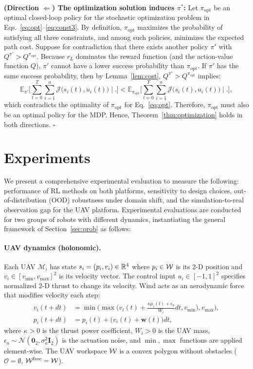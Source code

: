\documentclass{article}
\providecommand{\obst}{\mathcal{O}}
\providecommand{\free}{\mathrm{free}}
\begin{document}
\textbf{(Direction $\Leftarrow$) The optimization solution induces $\pi^*$:} Let $\pi_{\mathrm{opt}}$ be an optimal closed-loop policy for the stochastic optimization problem in Eqs.~\eqref{eq:opt}--\eqref{eq:const3}. By definition, $\pi_{\mathrm{opt}}$ maximizes the probability of satisfying all three constraints, and among such policies, minimizes the expected path cost. Suppose for contradiction that there exists another policy $\pi'$ with $Q^{\pi'} > Q^{\pi_{\mathrm{opt}}}$. Because $r_L$ dominates the reward function (and the action-value function $Q$), $\pi'$ cannot have a lower success probability than $\pi_{\mathrm{opt}}$. If $\pi'$ has the same success probability, then by Lemma~\ref{lem:cost}, $Q^{\pi'} > Q^{\pi_{\mathrm{opt}}}$ implies:
\[
\mathbb{E}_{\pi'} \Big[\sum_{t=0}^T \sum_{i=1}^n \mathcal{J} \big(s_i(t), u_i(t)\big) \mid . \Big]
< \mathbb{E}_{\pi_{\mathrm{opt}}} \Big[\sum_{t=0}^T \sum_{i=1}^n \mathcal{J} \big(s_i(t), u_i(t)\big) \mid . \Big],
\]
which contradicts the optimality of $\pi_{\mathrm{opt}}$ for Eq.~\eqref{eq:opt}. Therefore, $\pi_{\mathrm{opt}}$ must also be an optimal policy for the MDP. Hence, Theorem~\ref{thm:optimization} holds in both directions. \hfill$\square$

\section{Experiments}
\label{sec:exp}

We present a comprehensive experimental evaluation to measure the following: performance of RL methods on both platforms, sensitivity to design choices, out-of-distribution (OOD) robustness under domain shift, and the simulation-to-real observation gap for the UAV platform. Experimental evaluations are conducted for two groups of robots with different dynamics, instantiating the general framework of Section~\ref{sec:prob} as follows:

\paragraph{UAV dynamics (holonomic).}
Each UAV $\mathcal{M}_i$ has state $s_i = (p_i, v_i) \in \mathbb{R}^4$ where $p_i \in \mathcal{W}$ is its 2-D position and $v_i \in [v_{\min}, v_{\max}]^2$ is its velocity vector. The control input $u_i \in [-1,1]^2$ specifies normalized 2-D thrust to change its velocity. Wind acts as an aerodynamic force that modifies velocity each step:
\begin{align}
    v_i(t+dt) &= \min \Big( \max \Big( v_i(t) + \tfrac{\kappa \mu_i(t) + \epsilon_a}{W_i} dt,  v_{\min} \Big),  v_{\max}\Big), \label{eq:uav_vel} \\
    p_i(t+dt) &= p_i(t) + \big(v_i(t) + \mathbf{w}(t)\big) dt, \label{eq:uav_pos}
\end{align}
where $\kappa > 0$ is the thrust power coefficient, $W_i > 0$ is the UAV mass, $\epsilon_a \sim \mathcal{N}(\mathbf{0}_2, \sigma_a^2 \mathbf{I}_2)$ is the actuation noise, and $\min, \max$ functions are applied element-wise. The UAV workspace $\mathcal{W}$ is a convex polygon without obstacles ($\obst = \emptyset$, $\wspace^{\free} = \wspace$).
\end{document}
